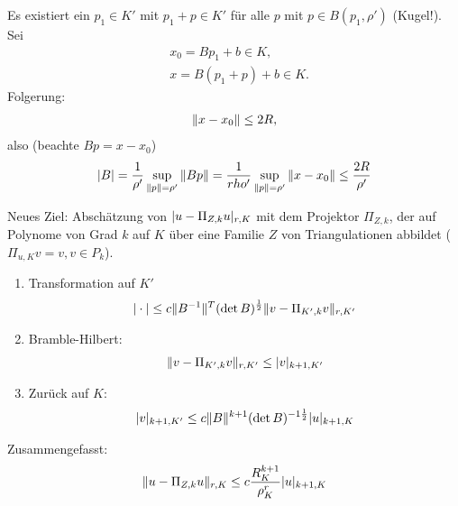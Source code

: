 \begin{beweis}
  Es existiert ein $p_1 \in K'$ mit $p_1 + p \in K'$ für alle $p$ mit $p \in B(p_1, \rho')$ (Kugel!).
Sei
\begin{align*}
 & x_0 = B p_1 + b \in K, \\
&x = B(p_1+ p) + b \in K.
\end{align*}
Folgerung: 
\begin{align*}
  \|x - x_0\| \leq 2 R, 
\end{align*}
also (beachte $Bp = x - x_0$)
\begin{align*}
  |B| = \frac 1 {\rho'} \sup_{\|p\| = \rho'}\|Bp\| = \frac 1 {rho'} \sup_{\|p\| = \rho'}\|x - x_0\|\leq \frac{2 R}{\rho'}
\end{align*}
\end{beweis} 

Neues Ziel: Abschätzung von $|u - \Pi_{Z, k}u|_{r, K}$ mit dem Projektor $\Pi_{Z, k}$, der auf Polynome von Grad $k$ auf $K$ über eine Familie $Z$ von Triangulationen abbildet ($\Pi_{u, K}v = v, v \in P_k$).
\begin{enumerate}
\item Transformation auf $K'$
  \begin{align*}
    |\cdot| \leq c \|B^{-1}\|^T(\det B)^{\frac 1 2} \|v - \Pi_{K', k}v\|_{r, K'}
  \end{align*}
\item Bramble-Hilbert:
  \begin{align*}
        \|v - \Pi_{K', k}v\|_{r, K'} \leq |v| _{k+1, K'}
  \end{align*}
\item Zurück auf $K$: 
  \begin{align*}
    |v|_{k+1, K'} \leq c \|B\|^{k+1} (\det B)^{-1 \frac 12} |u|_{k+1, K}
  \end{align*}
\end{enumerate}

Zusammengefasst:
\begin{align*}
  \|u - \Pi_{Z, k}u\|_{r, K}\leq c \frac {R_K^{k+1}}{\rho_K^r} |u|_{k+1, K}
\end{align*}


